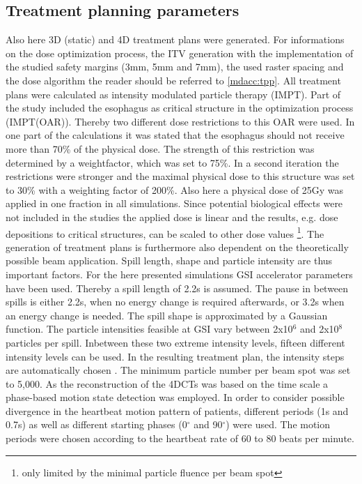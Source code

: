 \subsection{Treatment planning parameters}
\label{human:tpp}
Also here 3D (static) and 4D treatment plans were generated. For informations on the dose optimization process, the ITV generation 
with the implementation of the studied safety margins (3mm, 5mm and 7mm), the used raster spacing and the dose 
algorithm the reader should be referred to \ref{mdacc:tpp}.\newline
\newline
All treatment plans were calculated as intensity modulated particle therapy (IMPT). Part of the study included the 
esophagus as critical structure in the optimization process (IMPT(OAR)). Thereby two different dose restrictions to this OAR were used. 
In one part of the calculations it was stated that the esophagus should not receive more than 70\% of the physical dose. 
The strength of this restriction was determined by a weightfactor, which was set to 75\%. In a second iteration the restrictions were stronger and 
the maximal physical dose to this structure was set to 30\% with a weighting factor of 200\%. 
Also here a physical dose of 25Gy was applied in one fraction in all simulations. Since potential biological 
effects were not included in the studies the applied dose is linear and the results, e.g. dose depositions to critical structures, can be 
scaled to other dose values \footnote{only limited by the minimal particle fluence per beam spot}.\newline
\newline
The generation of treatment plans is furthermore also dependent on the theoretically possible 
beam application. Spill length, shape and particle intensity are thus important factors. For the here presented simulations GSI accelerator 
parameters have been used. Thereby a spill length of 2.2s is assumed. The pause in between spills is either 2.2s, when no energy change is 
required afterwards, or 3.2s when an energy change is needed. The spill shape is approximated by a Gaussian function. The particle intensities 
feasible at GSI vary between 2x10$^{6}$ and 2x10$^{8}$ particles per spill. Inbetween these two extreme intensity levels, 
fifteen different intensity levels can be used. In the resulting treatment plan, the intensity steps are automatically chosen \cite{Krae00, Ric13}. 
The minimum particle number per beam spot was set to 5,000.\newline
\newline
As the reconstruction of the 4DCTs was based on the time scale a phase-based motion state detection was employed. 
In order to consider possible divergence in the heartbeat motion pattern of patients, different periods (1s and 0.7s) as well as 
different starting phases (0$^{\circ}$ and 90$^{\circ}$) were used. The motion periods were chosen according to the heartbeat rate of 
60 to 80 beats per minute. 


